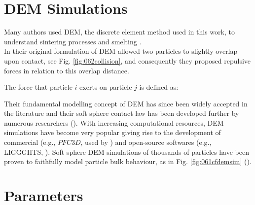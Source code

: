 \section{DEM Simulations}
\label{sec:demsimulations}

Many authors used \acs{DEM}, the discrete
element method used in this work, to understand sintering processes 
\cite{RefWorks:196, RefWorks:197} and smelting \cite{RefWorks:198,
RefWorks:199}.\\
In their original formulation of \acs{DEM} \citet{RefWorks:172} allowed two particles to slightly overlap upon
contact, see Fig. \ref{fig:062collision}, and consequently they proposed
repulsive forces in relation to this overlap distance.

The force that particle $i$ exerts on particle $j$ is defined as:

Their fundamental modelling concept of \acs{DEM} has
since been widely accepted in the literature and their soft sphere contact law has been developed further by
numerous researchers (\citet{RefWorks:148, RefWorks:145}).
With increasing computational resources, \acs{DEM} simulations have become very
popular giving rise to the development of commercial (e.g., $PFC3D$, used by
\citet{RefWorks:87}) and open-source softwares (e.g.,
\acs{LIGGGHTS}, \citet{RefWorks:132, RefWorks:136, RefWorks:139, RefWorks:147}).
Soft-sphere \acs{DEM} simulations of thousands of particles have been proven to 
faithfully model particle bulk behaviour, as in Fig. \ref{fig:061cfdemsim}
(\citet{RefWorks:86}).\\
 

\section{Parameters}
\label{sec:parameters}

